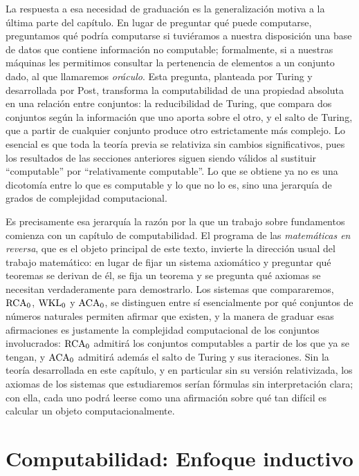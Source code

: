 La respuesta a esa necesidad de graduación es la generalización motiva a la última parte del capítulo. En lugar de preguntar qué puede computarse, preguntamos qué podría computarse si tuviéramos a nuestra disposición una base de datos que contiene información no computable; formalmente, si a nuestras máquinas les permitimos consultar la pertenencia de elementos a un conjunto dado, al que llamaremos \emph{oráculo}. Esta pregunta, planteada por Turing y desarrollada por Post, transforma la computabilidad de una propiedad absoluta en una relación entre conjuntos: la reducibilidad de Turing, que compara dos conjuntos según la información que uno aporta sobre el otro, y el salto de Turing, que a partir de cualquier conjunto produce otro estrictamente más complejo. Lo esencial es que toda la teoría previa se relativiza sin cambios significativos, pues los resultados de las secciones anteriores siguen siendo válidos al sustituir ``computable'' por ``relativamente computable''. Lo que se obtiene ya no es una dicotomía entre lo que es computable y lo que no lo es, sino una jerarquía de grados de complejidad computacional.

Es precisamente esa jerarquía la razón por la que un trabajo sobre fundamentos comienza con un capítulo de computabilidad. El programa de las \emph{matemáticas en reversa}, que es el objeto principal de este texto, invierte la dirección usual del trabajo matemático: en lugar de fijar un sistema axiomático y preguntar qué teoremas se derivan de él, se fija un teorema y se pregunta qué axiomas se necesitan verdaderamente para demostrarlo. Los sistemas que compararemos, $\mathrm{RCA}_{0}$, $\mathrm{WKL}_{0}$ y $\mathrm{ACA}_{0}$, se distinguen entre sí esencialmente por qué conjuntos de números naturales permiten afirmar que existen, y la manera de graduar esas afirmaciones es justamente la complejidad computacional de los conjuntos involucrados: $\mathrm{RCA}_{0}$ admitirá los conjuntos computables a partir de los que ya se tengan, y $\mathrm{ACA}_{0}$ admitirá además el salto de Turing y sus iteraciones. Sin la teoría desarrollada en este capítulo, y en particular sin su versión relativizada, los axiomas de los sistemas que estudiaremos serían fórmulas sin interpretación clara; con ella, cada uno podrá leerse como una afirmación sobre qué tan difícil es calcular un objeto computacionalmente.

\section{Computabilidad: Enfoque inductivo}

